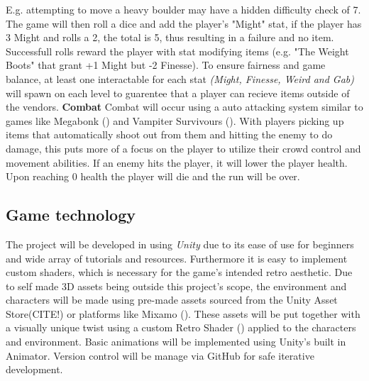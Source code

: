 \documentclass[progress]{cmpreport}
\begin{document}
E.g. attempting to move a heavy boulder may have a hidden difficulty check of 7. The game will then roll a dice and add the player's "Might" stat, if the player has 3 Might and rolls a 2, the total is 5, thus resulting in a failure and no item.
Successfull rolls reward the player with stat modifying items (e.g. "The Weight Boots" that grant +1 Might but -2 Finesse).
\newline
\newline
To ensure fairness and game balance, at least one interactable for each stat \emph{(Might, Finesse, Weird and Gab)} will spawn on each level to guarentee that a player can recieve items outside of the vendors.
\newline
\newline
\textbf{Combat}
\newline
Combat will occur using a auto attacking system similar to games like Megabonk (\cite{megabonk}) and Vampiter Survivours (\cite{vampiresurvivors}). With players picking up items that automatically shoot out from them and hitting the enemy to do damage, this puts more of a focus on the player to utilize their crowd control and movement abilities. If an enemy hits the player, it will lower the player health. Upon reaching 0 health the player will die and the run will be over.
\newline
\subsection{Game technology}
The project will be developed in using \emph{Unity} due to its ease of use for beginners and wide array of tutorials and resources. Furthermore it is easy to implement custom shaders, which is necessary for the game's
intended retro aesthetic.
\newline
\newline
Due to self made 3D assets being outside this project's scope, the environment and characters will be made using pre-made assets sourced from the Unity Asset Store(CITE!) or platforms like Mixamo (\cite{mixamo}). These assets will be put together with a visually unique twist using 
a custom Retro Shader (\cite{retroshader}) applied to the characters and environment. Basic animations will be implemented using Unity's built in Animator. Version control will be manage via GitHub for safe iterative development.
\end{document}
